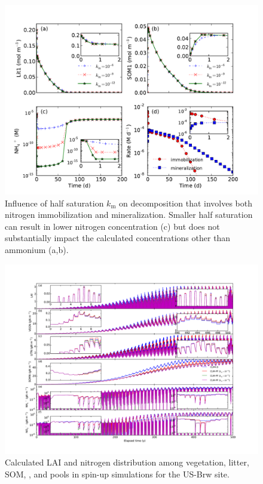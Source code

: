 \documentclass[gmd, manuscript]{copernicus}
\begin{document}
\begin{figure}[t]
\includegraphics[width=15cm]{../figs/fig09/figdecomp.pdf}
\caption{Influence of half saturation $k_\text{m}$ on decomposition that involves both
nitrogen immobilization and mineralization. Smaller half saturation can result
in lower nitrogen concentration (c) but does not substantially impact the
calculated concentrations other than ammonium (a,b).}
\label{fig:decomp}
\end{figure}

\begin{figure}[t]
\includegraphics[width=18cm]{../figs/fig10/brw500yl.pdf}
\caption{Calculated LAI and nitrogen distribution among vegetation, litter,
SOM, , and  pools in spin-up simulations for the US-Brw
site.}
\label{fig:brw500yl}
\end{figure}
\end{document}
